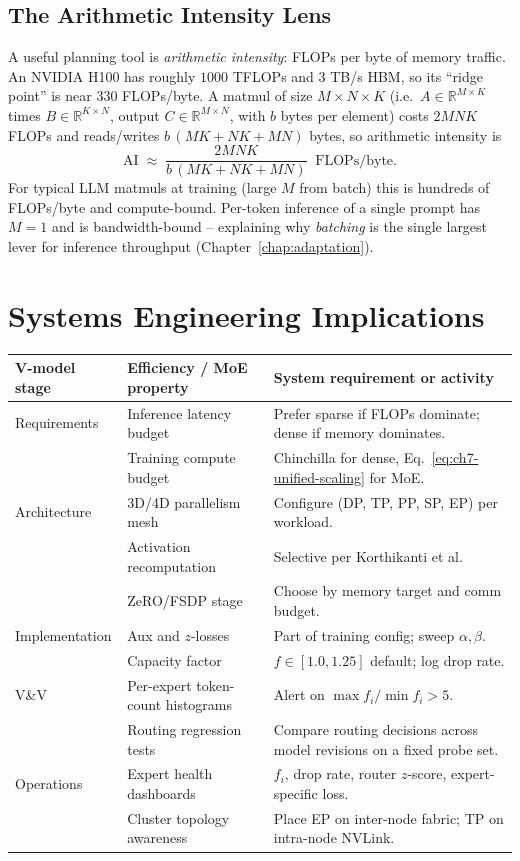 \subsection{The Arithmetic Intensity Lens}

A useful planning tool is \emph{arithmetic intensity}: FLOPs per byte
of memory traffic. An NVIDIA H100 has roughly $1000$ TFLOPs and
$3$ TB/s HBM, so its ``ridge point'' is near $330$ FLOPs/byte. A
matmul of size $M \times N \times K$ (i.e.\ $A \in \mathbb{R}^{M\times K}$
times $B \in \mathbb{R}^{K\times N}$, output $C \in \mathbb{R}^{M\times N}$,
with $b$ bytes per element) costs $2MNK$ FLOPs and reads/writes
$b\,(MK + NK + MN)$ bytes, so arithmetic intensity is
\begin{equation*}
\mathrm{AI} \;\approx\; \frac{2MNK}{b\,(MK + NK + MN)}\;\;\mathrm{FLOPs/byte}.
\end{equation*}
For typical LLM matmuls at training (large $M$ from batch) this
is hundreds of FLOPs/byte and compute-bound. Per-token inference of a
single prompt has $M = 1$ and is bandwidth-bound -- explaining why
\emph{batching} is the single largest lever for inference throughput
(Chapter~\ref{chap:adaptation}).

\section{Systems Engineering Implications}

\begin{center}
\begin{tabular}{|p{3.4cm}|p{3.4cm}|p{6.8cm}|}
\hline
V-model stage & Efficiency / MoE property & System requirement or activity \\
\hline
Requirements & Inference latency budget & Prefer sparse if FLOPs
   dominate; dense if memory dominates. \\
 & Training compute budget & Chinchilla for dense, Eq.\,
   \eqref{eq:ch7-unified-scaling} for MoE. \\
\hline
Architecture & 3D/4D parallelism mesh & Configure
   (DP, TP, PP, SP, EP) per workload. \\
 & Activation recomputation & Selective per Korthikanti et al. \\
 & ZeRO/FSDP stage & Choose by memory target and
   comm budget. \\
\hline
Implementation & Aux and $z$-losses & Part of training config;
   sweep $\alpha, \beta$. \\
 & Capacity factor & $f \in [1.0, 1.25]$ default;
   log drop rate. \\
\hline
V\&V & Per-expert token-count histograms
     & Alert on $\max f_i / \min f_i > 5$. \\
 & Routing regression tests & Compare routing decisions across
   model revisions on a fixed probe set. \\
\hline
Operations & Expert health dashboards & $f_i$, drop rate, router
   $z$-score, expert-specific loss. \\
 & Cluster topology awareness & Place EP on inter-node fabric; TP
   on intra-node NVLink. \\
\hline
\end{tabular}
\end{center}

